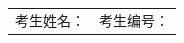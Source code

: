 \documentclass[12pt,a4paper]{exam-zh}
\begin{document}
\vspace{2.0em}

\begin{center}
  {\setlength{\fboxrule}{1.2pt}}
\end{center}

\vfill

\begin{tabular*}{\linewidth}{@{\extracolsep{\fill}}ll}
考生姓名：\underline{\hspace{4.2cm}} & 考生编号：\underline{\hspace{4.0cm}}
\end{tabular*}

\newpage
\end{document}
